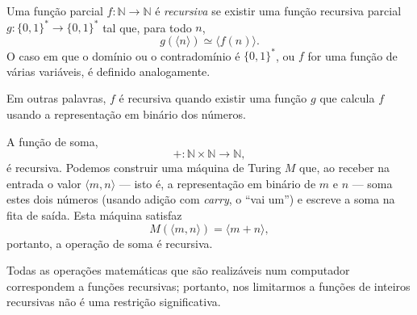 \begin{definition}
    Uma função parcial $f: \mathbb N \to \mathbb N$ é \emph{recursiva}
    se existir uma função recursiva parcial $g: \{0, 1\}^* \to \{0, 1\}^*$
    tal que, para todo $n$,
    \begin{equation*}
        g(\langle n \rangle) \simeq \langle f(n) \rangle.
    \end{equation*}
    O caso em que o domínio ou o contradomínio é $\{0, 1\}^*$,
    ou $f$ for uma função de várias variáveis,
    é definido analogamente.
\end{definition}

Em outras palavras,
$f$ é recursiva quando existir uma função $g$
que calcula $f$ usando a representação em binário dos números.

\begin{example}
    A função de soma,
    \begin{equation*}
        +: \mathbb N \times \mathbb N \to \mathbb N,
    \end{equation*}
    é recursiva.
    Podemos construir uma máquina de Turing $M$ que,
    ao receber na entrada o valor $\langle m, n \rangle$
    --- isto é, a representação em binário de $m$ e $n$ ---
    soma estes dois números
    (usando adição com \emph{carry}, o ``vai um'')
    e escreve a soma na fita de saída.
    Esta máquina satisfaz
    \begin{equation*}
        M(\langle m, n \rangle) = \langle m+n \rangle,
    \end{equation*}
    portanto, a operação de soma é recursiva.
\end{example}

Todas as operações matemáticas que são realizáveis num computador
correspondem a funções recursivas;
portanto,
nos limitarmos a funções de inteiros recursivas não é uma restrição significativa.
